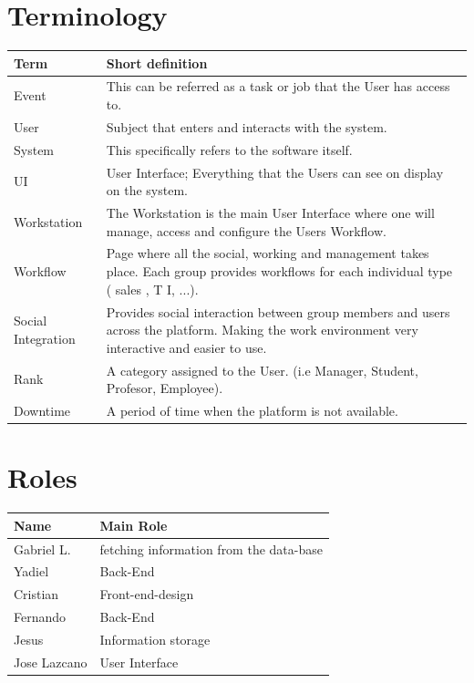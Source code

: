 \documentclass{article}[draft]
\begin{document}
\section{Terminology}
\begin{center}

    \begin{tabular}{| l | p{5cm} |}\hline
    Term & Short definition \\ \hline
    Event & This can be referred as a task or job that the User has access to. \\ \hline
    User & Subject that enters and interacts with the system. \\ \hline
    System & This specifically refers to the software itself. \\ \hline
    UI & User Interface; Everything that the Users can see on display on the system. \\ \hline
    Workstation & The Workstation is the main User Interface where one will manage, access and configure the Users Workflow. \\ \hline
    Workflow & Page where all the social, working and management takes place. Each group provides workflows for each individual type ( sales
    , T I, ...). \\ \hline
    Social Integration & Provides social interaction between group members and users across the platform. Making the work environment very interactive
    and easier to use. \\ \hline
    Rank & A category assigned to the User. (i.e Manager, Student, Profesor, Employee). \\ \hline
    Downtime & A period of time when the platform is not available. \\ \hline
    \end{tabular}

\end{center}
\section{Roles}
\vspace{10pt}
\begin{center}

\begin{tabular}{| l | p{5cm} |}\hline
Name & Main Role \\ \hline
Gabriel L. & fetching information from the data-base\\ \hline
Yadiel     & Back-End\\ \hline
Cristian   & Front-end-design \\ \hline
Fernando   & Back-End \\ \hline
Jesus	   & Information storage\\ \hline
Jose Lazcano  & User Interface \\ \hline
\end{tabular}

\end{center}
\end{document}
